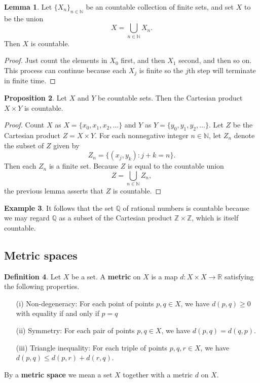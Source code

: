 \documentclass[12pt]{article}
\theoremstyle{definition}
\newtheorem{definition}{Definition}
\newtheorem{example}[definition]{Example}
\theoremstyle{theorem}
\newtheorem{proposition}[definition]{Proposition}
\newtheorem{lemma}[definition]{Lemma}
\begin{document}
\begin{lemma}
Let $\{X_n\}_{n \in \mathbb{N}}$ be an countable collection of finite sets, and set $X$ to be the union 
\[
X = \bigcup_{n \in \mathbb{N}} X_n.
\] 
Then $X$ is countable. 
\end{lemma}

\begin{proof}
Just count the elements in $X_0$ first, and then $X_1$ second, and then so on. This process can continue because each $X_j$ is finite so the $j$th step will terminate in finite time. 
\end{proof}

\begin{proposition}
Let $X$ and $Y$ be countable sets. Then the Cartesian product $X \times Y$ is countable. 
\end{proposition}

\begin{proof}
Count $X$ as $X = \{x_0, x_1, x_2, \ldots\}$ and $Y$ as $Y = \{y_0, y_1, y_2, \ldots\}$. Let $Z$ be the Cartesian product $Z = X \times Y$. For each nonnegative integer $n \in \mathbb{N}$, let $Z_n$ denote the subset of $Z$ given by 
\[
Z_n = \{(x_j, y_k) : j + k = n\}.
\]
Then each $Z_n$ is a finite set. Because $Z$ is equal to the countable union 
\[
Z = \bigcup_{n \in \mathbb{N}}Z_n,
\]
the previous lemma asserts that $Z$ is countable. 
\end{proof}

\begin{example}
It follows that the set $\mathbb{Q}$ of rational numbers is countable because we may regard $\mathbb{Q}$ as a subset of the Cartesian product $\mathbb{Z} \times \mathbb{Z}$, which is itself countable. 
\end{example}

\subsection{Metric spaces}

\begin{definition}
Let $X$ be a set. A \textbf{metric} on $X$ is a map $d : X \times X \to \mathbb{R}$ satisfying the following properties. 
\begin{enumerate}
\item[(i)] Non-degeneracy: For each point of points $p,q \in X$, we have $d(p,q) \geqslant 0$ with equality if and only if $p = q$
\item[(ii)] Symmetry: For each pair of points $p,q \in X$, we have $d(p,q) = d(q,p)$.
\item[(iii)] Triangle inequality: For each triple of points $p,q,r \in X$, we have $d(p,q) \leqslant d(p,r) + d(r,q)$. 
\end{enumerate}
By a \textbf{metric space} we mean a set $X$ together with a metric $d$ on $X$. 
\end{definition}
\end{document}
